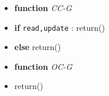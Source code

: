 \documentclass[conference]{IEEEtran}
\begin{document}
\vspace{1mm}
\begin{itemize}
\small
\itemsep0.08em
\item[] \hspace{-10mm}\textbf{function} \textit{CC-G}
\item[] \hspace{-3mm}\textbf{if} \texttt{read,update} : return()
\item[] \hspace{-3mm}\textbf{else} return()
\end{itemize}
\vspace{1mm}
\begin{itemize}
\small
\itemsep0.08em
\item[] \hspace{-10mm}\textbf{function} \textit{OC-G}
\item[] \hspace{-3mm}return()
\end{itemize}
\vspace{1mm}
\end{document}
